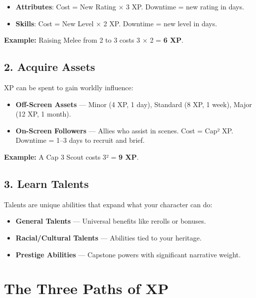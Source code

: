 \begin{itemize}
  \item \textbf{Attributes}:  Cost = New Rating × 3 XP. Downtime = new rating in days.
  \item \textbf{Skills}:  Cost = New Level × 2 XP. Downtime = new level in days.
\end{itemize}

\textbf{Example:} Raising Melee from 2 to 3 costs 3 × 2 = \textbf{6 XP}.

\subsection*{2. Acquire Assets}

XP can be spent to gain worldly influence:

\begin{itemize}
  \item \textbf{Off-Screen Assets} — Minor (4 XP, 1 day), Standard (8 XP, 1 week), Major (12 XP, 1 month).
  \item \textbf{On-Screen Followers}  — Allies who assist in scenes. Cost = Cap² XP. Downtime = 1–3 days to recruit and brief.
\end{itemize}

\textbf{Example:} A Cap 3 Scout costs 3² = \textbf{9 XP}.

\subsection*{3. Learn Talents}

Talents are unique abilities that expand what your character can do:

\begin{itemize}
  \item \textbf{General Talents} — Universal benefits like rerolls or bonuses.
  \item \textbf{Racial/Cultural Talents} — Abilities tied to your heritage.
  \item \textbf{Prestige Abilities}  — Capstone powers with significant narrative weight.
\end{itemize}

\section{The Three Paths of XP}

